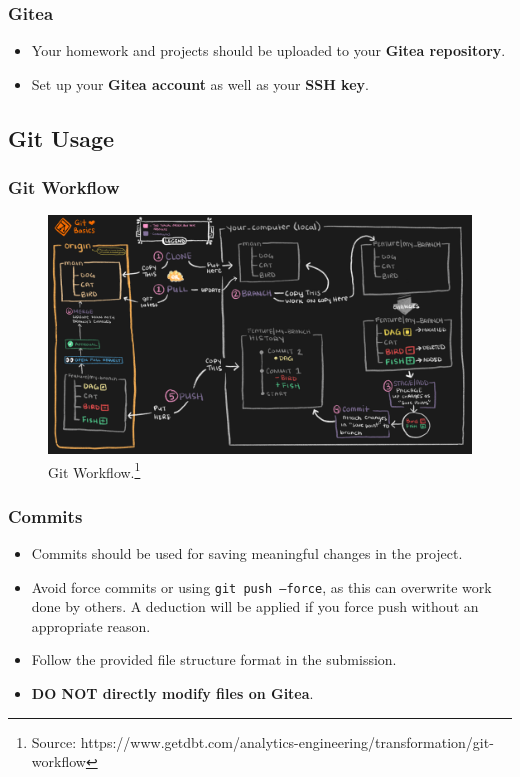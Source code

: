 \documentclass[
	11pt, %
]{beamer}
\begin{document}
\begin{frame}
	\frametitle{Gitea}
 
	\begin{itemize}
    \item Your homework and projects should be uploaded to your \textbf{Gitea repository}.
    \item Set up your \textbf{Gitea account} as well as your \textbf{SSH key}.
\end{itemize}

\end{frame}


\subsection{Git Usage}

\begin{frame}
	\frametitle{Git Workflow}
	
	\begin{figure}
		\includegraphics[width=0.8\linewidth]{git_workflow.png}
		\caption{Git Workflow.\footnote{Source: https://www.getdbt.com/analytics-engineering/transformation/git-workflow}}
	\end{figure}
\end{frame}

\begin{frame}
	\frametitle{Commits}
 
	\begin{itemize}
    \item Commits should be used for saving meaningful changes in the project.
    \item Avoid force commits or using \texttt{git push --force}, as this can overwrite work done by others. A deduction will be applied if you force push without an appropriate reason.
    \item Follow the provided file structure format in the submission.
    \item \textbf{DO NOT directly modify files on Gitea}.
\end{itemize}

\end{frame}
\end{document}
